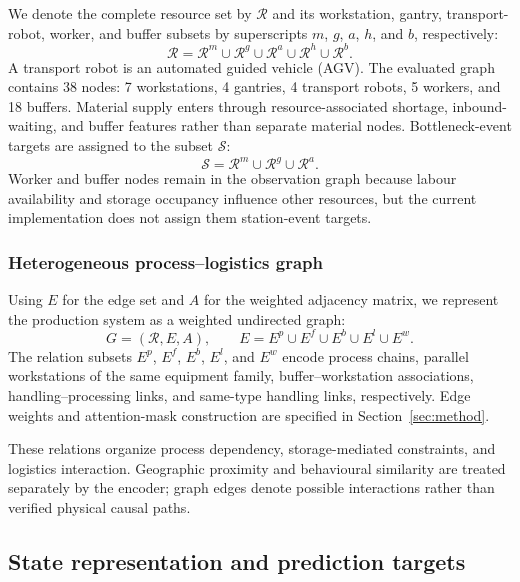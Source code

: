 \documentclass[a4paper,fleqn]{cas-dc}
\begin{document}
We denote the complete resource set by $\mathcal{R}$ and its workstation, gantry, transport-robot, worker, and buffer subsets by superscripts $m$, $g$, $a$, $h$, and $b$, respectively:
\begin{equation}
\mathcal{R}=\mathcal{R}^{m}\cup\mathcal{R}^{g}\cup
\mathcal{R}^{a}\cup\mathcal{R}^{h}\cup\mathcal{R}^{b}.
\end{equation}
A transport robot is an automated guided vehicle (AGV). The evaluated graph contains 38 nodes: 7 workstations, 4 gantries, 4 transport robots, 5 workers, and 18 buffers. Material supply enters through resource-associated shortage, inbound-waiting, and buffer features rather than separate material nodes. Bottleneck-event targets are assigned to the subset $\mathcal{S}$:
\begin{equation}
\mathcal{S}=\mathcal{R}^{m}\cup\mathcal{R}^{g}\cup\mathcal{R}^{a}.
\end{equation}
Worker and buffer nodes remain in the observation graph because labour availability and storage occupancy influence other resources, but the current implementation does not assign them station-event targets.

\subsubsection{Heterogeneous process--logistics graph}

Using $E$ for the edge set and $A$ for the weighted adjacency matrix, we represent the production system as a weighted undirected graph:
\begin{equation}
G=(\mathcal{R},E,A),\qquad
E=E^{p}\cup E^{f}\cup E^{b}\cup E^{l}\cup E^{w}.
\end{equation}
The relation subsets $E^{p}$, $E^{f}$, $E^{b}$, $E^{l}$, and $E^{w}$ encode process chains, parallel workstations of the same equipment family, buffer--workstation associations, handling--processing links, and same-type handling links, respectively. Edge weights and attention-mask construction are specified in Section~\ref{sec:method}.

These relations organize process dependency, storage-mediated constraints, and logistics interaction. Geographic proximity and behavioural similarity are treated separately by the encoder; graph edges denote possible interactions rather than verified physical causal paths.

\subsection{State representation and prediction targets}
\end{document}
